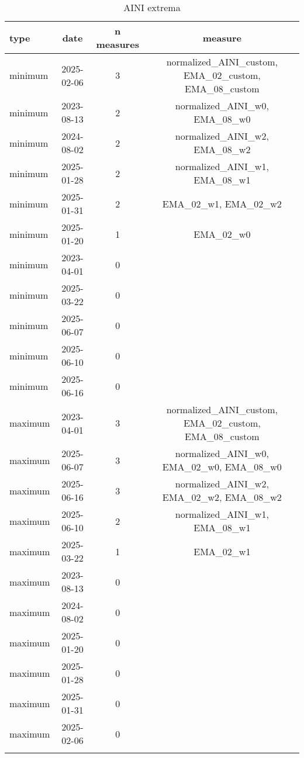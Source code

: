\begin{table}[!htbp]
\centering
\begin{adjustbox}{width=\textwidth}
\begin{tabular}{lccc}
\toprule
\addlinespace
type & date & n measures & measure \\
\midrule
\addlinespace
minimum & 2025-02-06 & 3 & normalized\_AINI\_custom, EMA\_02\_custom, EMA\_08\_custom \\
minimum & 2023-08-13 & 2 & normalized\_AINI\_w0, EMA\_08\_w0 \\
minimum & 2024-08-02 & 2 & normalized\_AINI\_w2, EMA\_08\_w2 \\
minimum & 2025-01-28 & 2 & normalized\_AINI\_w1, EMA\_08\_w1 \\
minimum & 2025-01-31 & 2 & EMA\_02\_w1, EMA\_02\_w2 \\
minimum & 2025-01-20 & 1 & EMA\_02\_w0 \\
minimum & 2023-04-01 & 0 &  \\
minimum & 2025-03-22 & 0 &  \\
minimum & 2025-06-07 & 0 &  \\
minimum & 2025-06-10 & 0 &  \\
minimum & 2025-06-16 & 0 &  \\
maximum & 2023-04-01 & 3 & normalized\_AINI\_custom, EMA\_02\_custom, EMA\_08\_custom \\
maximum & 2025-06-07 & 3 & normalized\_AINI\_w0, EMA\_02\_w0, EMA\_08\_w0 \\
maximum & 2025-06-16 & 3 & normalized\_AINI\_w2, EMA\_02\_w2, EMA\_08\_w2 \\
maximum & 2025-06-10 & 2 & normalized\_AINI\_w1, EMA\_08\_w1 \\
maximum & 2025-03-22 & 1 & EMA\_02\_w1 \\
maximum & 2023-08-13 & 0 &  \\
maximum & 2024-08-02 & 0 &  \\
maximum & 2025-01-20 & 0 &  \\
maximum & 2025-01-28 & 0 &  \\
maximum & 2025-01-31 & 0 &  \\
maximum & 2025-02-06 & 0 &  \\
\addlinespace
\bottomrule
\end{tabular}
\end{adjustbox}
\caption{AINI extrema}
\label{tab:aini_extrema}
\end{table}
